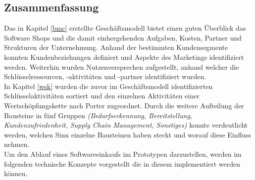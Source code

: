 \subsection{Zusammenfassung}
Das in Kapitel \ref{bmc} erstellte Geschäftsmodell bietet einen guten Überblick das Software Shops und die damit einhergehenden Aufgaben, Kosten, Partner und Strukturen der Unternehmung. Anhand der bestimmten Kundensegmente konnten Kundenbeziehungen definiert und Aspekte des Marketings identifiziert werden. Weiterhin wurden Nutzenversprechen aufgestellt, anhand welcher die Schlüsselressourcen, -aktivitäten und -partner identifiziert wurden.\\

In Kapitel \ref{wsk} wurden die zuvor im Geschäftsmodell identifizierten Schlüsselaktivitäten sortiert und den einzelnen Aktivitäten einer Wertschöpfungskette nach Porter zugeordnet. Durch die weitere Aufteilung der Bausteine in fünf Gruppen \textit{(Bedarfserkennung, Bereitstellung, Kundenzufriedenheit, Supply Chain Management, Sonstiges)} konnte verdeutlicht werden, welchen Sinn einzelne Bausteinen haben steckt und worauf diese Einfluss nehmen.\\

Um den Ablauf eines Softwareeinkaufs im Prototypen darzustellen, werden im folgenden technische Konzepte vorgestellt die in diesem implementiert werden können.